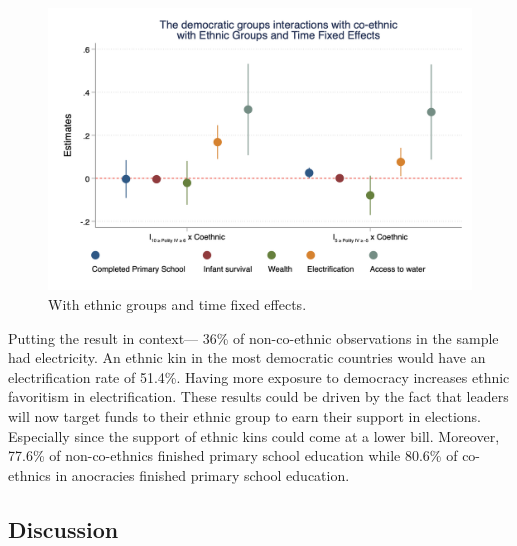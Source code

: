 \documentclass{wptemp}
\begin{document}
\begin{figure}[!htb]
\centering
\includegraphics[width=.9\linewidth]{figure/coeth_dem_ethFE.png}
\caption{With ethnic groups and time fixed  effects.}
\label{fig:coedemet}
\end{figure}

Putting the result in context--- 36\% of non-co-ethnic observations in the sample had electricity. An ethnic kin in the most democratic countries would have an electrification rate of 51.4\%. Having more exposure to democracy increases ethnic favoritism in electrification. These results could be driven by the fact that leaders will now target funds to their ethnic group to earn their support in elections. Especially since the support of ethnic kins could come at a lower bill. Moreover, 77.6\% of non-co-ethnics finished primary school education while 80.6\% of co-ethnics in anocracies finished primary school education.

\subsection{Discussion}
\end{document}
